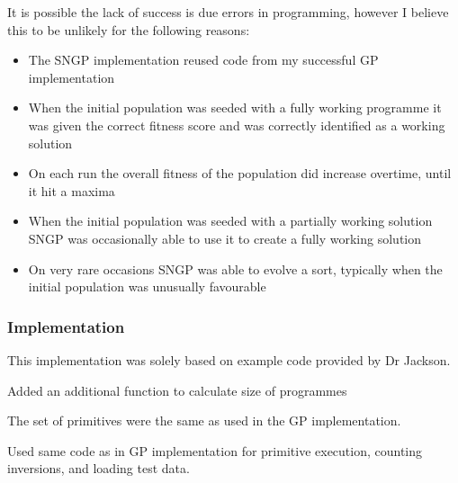 \documentclass{beamer}
\begin{document}
		\begin{frame}	
			It is possible the lack of success is due errors in programming, however I believe this to be unlikely for the following reasons:
			
			\begin{itemize}
				\item The SNGP implementation reused code from my successful GP implementation
				\pause
				\item When the initial population was seeded with a fully working programme it was given the correct fitness score and was correctly identified as a working solution
				\pause
				\item On each run the overall fitness of the population did increase overtime, until it hit a maxima
				\pause
				\item When the initial population was seeded with a partially working solution SNGP was occasionally able to use it to create a fully working solution
				\pause
				\item On very rare occasions SNGP was able to evolve a sort, typically when the initial population was unusually favourable
			\end{itemize}
		
		\end{frame}
	
		\begin{frame}
			
			\frametitle{Implementation}
			
			This implementation was solely based on example code provided by Dr Jackson.
			
			Added an additional function to calculate size of programmes
			
			The set of primitives were the same as used in the GP implementation.
			
			Used same code as in GP implementation for primitive execution, counting inversions, and loading test data.
			
			
			
		\end{frame}
	
\end{document}
